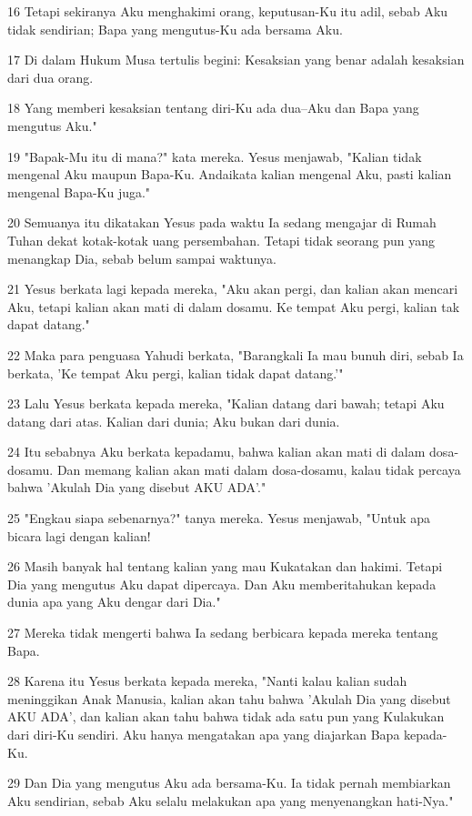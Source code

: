 \par 16 Tetapi sekiranya Aku menghakimi orang, keputusan-Ku itu adil, sebab Aku tidak sendirian; Bapa yang mengutus-Ku ada bersama Aku.
\par 17 Di dalam Hukum Musa tertulis begini: Kesaksian yang benar adalah kesaksian dari dua orang.
\par 18 Yang memberi kesaksian tentang diri-Ku ada dua--Aku dan Bapa yang mengutus Aku."
\par 19 "Bapak-Mu itu di mana?" kata mereka. Yesus menjawab, "Kalian tidak mengenal Aku maupun Bapa-Ku. Andaikata kalian mengenal Aku, pasti kalian mengenal Bapa-Ku juga."
\par 20 Semuanya itu dikatakan Yesus pada waktu Ia sedang mengajar di Rumah Tuhan dekat kotak-kotak uang persembahan. Tetapi tidak seorang pun yang menangkap Dia, sebab belum sampai waktunya.
\par 21 Yesus berkata lagi kepada mereka, "Aku akan pergi, dan kalian akan mencari Aku, tetapi kalian akan mati di dalam dosamu. Ke tempat Aku pergi, kalian tak dapat datang."
\par 22 Maka para penguasa Yahudi berkata, "Barangkali Ia mau bunuh diri, sebab Ia berkata, 'Ke tempat Aku pergi, kalian tidak dapat datang.'"
\par 23 Lalu Yesus berkata kepada mereka, "Kalian datang dari bawah; tetapi Aku datang dari atas. Kalian dari dunia; Aku bukan dari dunia.
\par 24 Itu sebabnya Aku berkata kepadamu, bahwa kalian akan mati di dalam dosa-dosamu. Dan memang kalian akan mati dalam dosa-dosamu, kalau tidak percaya bahwa 'Akulah Dia yang disebut AKU ADA'."
\par 25 "Engkau siapa sebenarnya?" tanya mereka. Yesus menjawab, "Untuk apa bicara lagi dengan kalian!
\par 26 Masih banyak hal tentang kalian yang mau Kukatakan dan hakimi. Tetapi Dia yang mengutus Aku dapat dipercaya. Dan Aku memberitahukan kepada dunia apa yang Aku dengar dari Dia."
\par 27 Mereka tidak mengerti bahwa Ia sedang berbicara kepada mereka tentang Bapa.
\par 28 Karena itu Yesus berkata kepada mereka, "Nanti kalau kalian sudah meninggikan Anak Manusia, kalian akan tahu bahwa 'Akulah Dia yang disebut AKU ADA', dan kalian akan tahu bahwa tidak ada satu pun yang Kulakukan dari diri-Ku sendiri. Aku hanya mengatakan apa yang diajarkan Bapa kepada-Ku.
\par 29 Dan Dia yang mengutus Aku ada bersama-Ku. Ia tidak pernah membiarkan Aku sendirian, sebab Aku selalu melakukan apa yang menyenangkan hati-Nya."
